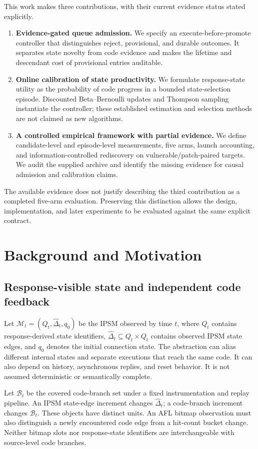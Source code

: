 \documentclass[final,5p,times,number]{elsarticle}
\begin{document}
This work makes three contributions, with their current evidence status stated explicitly.
\begin{enumerate}
\item \textbf{Evidence-gated queue admission.} We specify an execute-before-promote controller that distinguishes reject, provisional, and durable outcomes. It separates state novelty from code evidence and makes the lifetime and descendant cost of provisional entries auditable.
\item \textbf{Online calibration of state productivity.} We formulate response-state utility as the probability of code progress in a bounded state-selection episode. Discounted Beta--Bernoulli updates and Thompson sampling instantiate the controller; these established estimation and selection methods are not claimed as new algorithms.
\item \textbf{A controlled empirical framework with partial evidence.} We define candidate-level and episode-level measurements, five arms, launch accounting, and information-controlled rediscovery on vulnerable/patch-paired targets. We audit the supplied archive and identify the missing evidence for causal admission and calibration claims.
\end{enumerate}
The available evidence does not justify describing the third contribution as a completed five-arm evaluation. Preserving this distinction allows the design, implementation, and later experiments to be evaluated against the same explicit contract.

\section{Background and Motivation}
\label{sec:motivation}
\subsection{Response-visible state and independent code feedback}
Let $\mathcal{M}_t=(Q_t,\widehat{\Delta}_t,q_0)$ be the IPSM observed by time $t$, where $Q_t$ contains response-derived state identifiers, $\widehat{\Delta}_t\subseteq Q_t\times Q_t$ contains observed IPSM state edges, and $q_0$ denotes the initial connection state. The abstraction can alias different internal states and separate executions that reach the same code. It can also depend on history, asynchronous replies, and reset behavior. It is not assumed deterministic or semantically complete.

Let $\mathcal{B}_t$ be the covered code-branch set under a fixed instrumentation and replay pipeline. An IPSM state-edge increment changes $\widehat{\Delta}_t$; a code-branch increment changes $\mathcal{B}_t$. These objects have distinct units. An AFL bitmap observation must also distinguish a newly encountered code edge from a hit-count bucket change. Neither bitmap slots nor response-state identifiers are interchangeable with source-level code branches.
\end{document}
